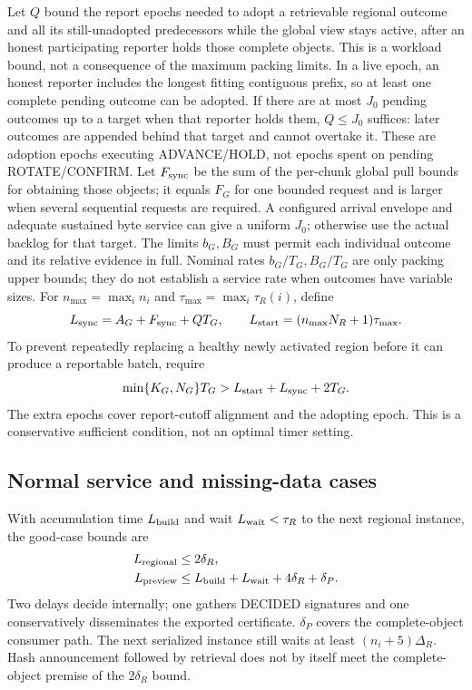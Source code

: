 \documentclass[11pt,a4paper,onecolumn]{article}
\theoremstyle{remark}\newtheorem{example}[definition]{Example}
\begin{document}
Let $Q$ bound the report epochs needed to adopt a retrievable regional outcome
and all its still-unadopted predecessors while the global view stays active,
after an honest participating reporter holds those complete objects.
This is a workload bound, not a consequence of the maximum packing limits.
In a live epoch, an honest reporter includes the longest fitting contiguous
prefix, so at least one complete pending outcome can be adopted. If there are
at most $J_0$ pending outcomes up to a target when that reporter holds them,
$Q\leq J_0$ suffices: later outcomes are appended behind that target and cannot
overtake it. These are adoption epochs executing ADVANCE/HOLD, not epochs
spent on pending ROTATE/CONFIRM. Let $F_{\rm sync}$ be the sum of the per-chunk
global pull bounds for obtaining those objects; it equals $F_G$ for one bounded
request and is larger when several sequential requests are required.
A configured arrival envelope and adequate sustained byte service
can give a uniform $J_0$; otherwise use the actual backlog for that target.
The limits $b_G,B_G$ must permit each individual outcome and its relative
evidence in full. Nominal rates $b_G/T_G,B_G/T_G$ are only packing upper bounds;
they do not establish a service rate when outcomes have variable sizes.
For $n_{\max}=\max_i n_i$ and $\tau_{\max}=\max_i\tau_R(i)$, define
\[
 L_{\rm sync}=A_G+F_{\rm sync}+QT_G,\qquad
 L_{\rm start}=(n_{\max}N_R+1)\tau_{\max}.
\]
To prevent repeatedly replacing a healthy newly activated region before it can
produce a reportable batch, require
\begin{equation}\label{eq:tenure}
 \min\{K_G,N_G\}T_G>L_{\rm start}+L_{\rm sync}+2T_G.
\end{equation}
The extra epochs cover report-cutoff alignment and the adopting epoch. This is
a conservative sufficient condition, not an optimal timer setting.

\subsection{Normal service and missing-data cases}
With accumulation time $L_{\rm build}$ and wait $L_{\rm wait}<\tau_R$ to the
next regional instance, the good-case bounds are
\begin{align}
 L_{\rm regional}&\leq2\delta_R,\label{eq:fast}\\
 L_{\rm preview}&\leq L_{\rm build}+L_{\rm wait}+4\delta_R+\delta_P.
 \label{eq:preview}
\end{align}
Two delays decide internally; one gathers DECIDED signatures and one
conservatively disseminates the exported certificate. $\delta_P$ covers the
complete-object consumer path. The next serialized instance still waits at
least $(n_i+5)\Delta_R$. Hash announcement followed by retrieval does not by
itself meet the complete-object premise of the $2\delta_R$ bound.
\end{document}
